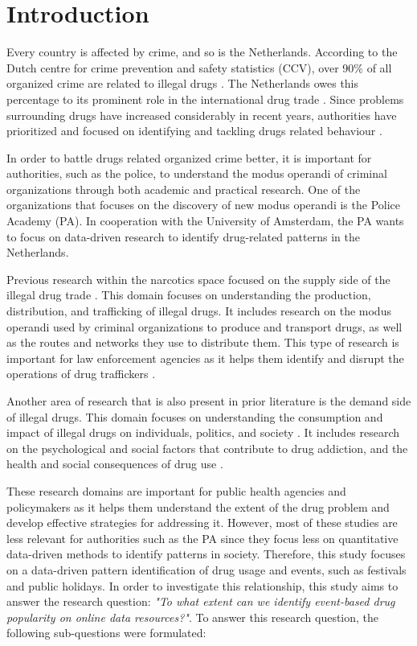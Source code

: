 \section{Introduction}

Every country is affected by crime, and so is the Netherlands. According to the Dutch centre for crime prevention and safety statistics (CCV), over 90\% of all organized crime are related to illegal drugs \cite{CCV}. The Netherlands owes this percentage to its prominent role in the international drug trade \cite{mcdermott}. Since problems surrounding drugs have increased considerably in recent years, authorities have prioritized and focused on identifying and tackling drugs related behaviour \cite{eski, ferwerda}. 

In order to battle drugs related organized crime better, it is important for authorities, such as the police, to understand the modus operandi of criminal organizations through both academic and practical research. One of the organizations that focuses on the discovery of new modus operandi is the Police Academy (PA). In cooperation with the University of Amsterdam, the PA wants to focus on data-driven research to identify drug-related patterns in the Netherlands. 

Previous research within the narcotics space focused on the supply side of the illegal drug trade \cite{paoli, magliocca}. This domain focuses on understanding the production, distribution, and trafficking of illegal drugs. It includes research on the modus operandi used by criminal organizations to produce and transport drugs, as well as the routes and networks they use to distribute them. This type of research is important for law enforcement agencies as it helps them identify and disrupt the operations of drug traffickers \cite{mcdermott}.

Another area of research that is also present in prior literature is the demand side of illegal drugs. This domain focuses on understanding the consumption and impact of illegal drugs on individuals, politics, and society \cite{riley, flores}. It includes research on the psychological and social factors that contribute to drug addiction, and the health and social consequences of drug use \cite{gonzalez, sesnie}. 

These research domains are important for public health agencies and policymakers as it helps them understand the extent of the drug problem and develop effective strategies for addressing it. However, most of these studies are less relevant for authorities such as the PA since they focus less on quantitative data-driven methods to identify patterns in society. Therefore, this study focuses on a data-driven pattern identification of drug usage and events, such as festivals and public holidays. In order to investigate this relationship, this study aims to answer the research question:
\textit{"To what extent can we identify event-based drug popularity on online data resources?"}. To answer this research question, the following sub-questions were formulated:

